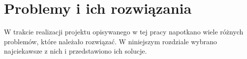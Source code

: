 \chapter{Problemy i ich rozwiązania}
\label{problems_and_solutions}

W trakcie realizacji projektu opisywanego w tej pracy napotkano wiele różnych problemów, które należało rozwiązać. W niniejszym rozdziale wybrano najciekawsze z nich i przedstawiono ich solucje. 

\section{ }